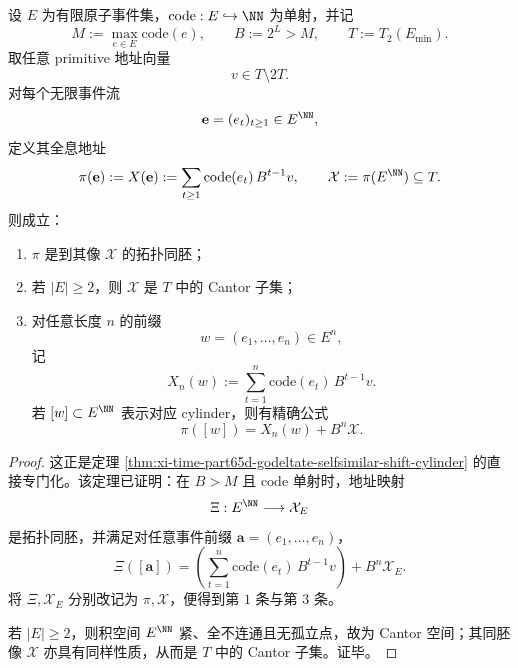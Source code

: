 \begin{theorem}\label{thm:xi-time-part9y-hologram-cantor-rigidity}
设 \(E\) 为有限原子事件集，\(\mathrm{code}:E\hookrightarrow \NN\) 为单射，并记
\[
M:=\max_{e\in E}\mathrm{code}(e),
\qquad
B:=2^L>M,
\qquad
T:=T_2(E_{\min}).
\]
取任意 primitive 地址向量
\[
v\in T\setminus 2T.
\]
对每个无限事件流
\[
\mathbf e=(e_t)_{t\ge 1}\in E^{\NN},
\]
定义其全息地址
\[
\pi(\mathbf e):=X(\mathbf e):=\sum_{t\ge 1}\mathrm{code}(e_t)\,B^{t-1}v,
\qquad
\mathcal X:=\pi(E^{\NN})\subseteq T.
\]
则成立：
\begin{enumerate}
  \item \(\pi\) 是到其像 \(\mathcal X\) 的拓扑同胚；
  \item 若 \(|E|\ge 2\)，则 \(\mathcal X\) 是 \(T\) 中的 Cantor 子集；
  \item 对任意长度 \(n\) 的前缀
  \[
  w=(e_1,\dots,e_n)\in E^n,
  \]
  记
  \[
  X_n(w):=\sum_{t=1}^{n}\mathrm{code}(e_t)\,B^{t-1}v.
  \]
  若 \([w]\subset E^{\NN}\) 表示对应 cylinder，则有精确公式
  \[
  \pi([w])=X_n(w)+B^n\mathcal X.
  \]
\end{enumerate}
\end{theorem}
\begin{proof}
这正是定理 \ref{thm:xi-time-part65d-godeltate-selfsimilar-shift-cylinder} 的直接专门化。该定理已证明：在 \(B>M\) 且 \(\mathrm{code}\) 单射时，地址映射
\[
\Xi:E^{\NN}\longrightarrow \mathcal X_E
\]
是拓扑同胚，并满足对任意事件前缀 \(\mathbf a=(e_1,\dots,e_n)\)，
\[
\Xi([\mathbf a])
=
\left(\sum_{t=1}^{n}\mathrm{code}(e_t)\,B^{t-1}v\right)+B^n\mathcal X_E.
\]
将 \(\Xi,\mathcal X_E\) 分别改记为 \(\pi,\mathcal X\)，便得到第 \(1\) 条与第 \(3\) 条。

若 \(|E|\ge 2\)，则积空间 \(E^{\NN}\) 紧、全不连通且无孤立点，故为 Cantor 空间；其同胚像 \(\mathcal X\) 亦具有同样性质，从而是 \(T\) 中的 Cantor 子集。证毕。
\end{proof}

